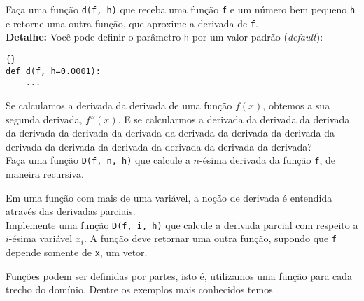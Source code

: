 \documentclass[12pt]{article}
\begin{document}
	\quest Faça uma função \texttt{d(f, h)} que receba uma função \texttt{f} e um número bem pequeno \texttt{h} e retorne uma outra função, que aproxime a derivada de \texttt{f}.\\
	
	\textbf{Detalhe:} Você pode definir o parâmetro \texttt{h} por um valor padrão (\textit{default}):
	
	\begin{lstlisting}{}
def d(f, h=0.0001):
	...
	\end{lstlisting}
	
	
	Se calculamos a derivada da derivada de uma função $f(x)$, obtemos a sua segunda derivada, $f''(x)$. E se calcularmos a derivada da derivada da derivada da derivada da derivada da derivada da derivada da derivada da derivada da derivada da derivada da derivada da derivada da derivada da derivada?\\
	
	\quest Faça uma função \texttt{D(f, n, h)} que calcule a $n$-ésima derivada da função \texttt{f}, de maneira recursiva.
	
	
	Em uma função com mais de uma variável, a noção de derivada é entendida através das derivadas parciais.\\
	
	\quest Implemente uma função \texttt{D(f, i, h)} que calcule a derivada parcial com respeito a $i$-ésima variável $x_i$. A função deve retornar uma outra função, supondo que \texttt{f} depende somente de \texttt{x}, um vetor.
	
	
	
	Funções podem ser definidas por partes, isto é, utilizamos uma função para cada trecho do domínio. Dentre os exemplos mais conhecidos temos
\end{document}
